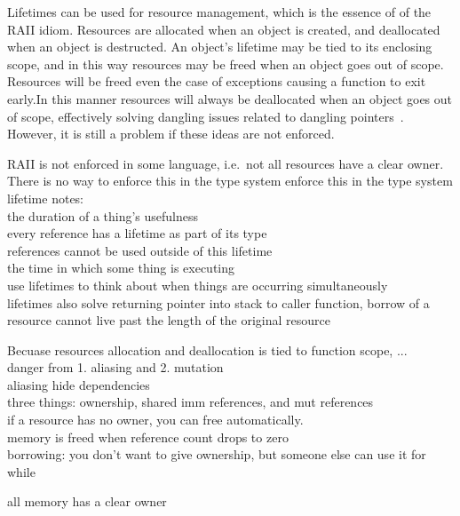 Lifetimes can be used for resource management, which is the essence of of the
RAII idiom. Resources are allocated when an object is created, and deallocated
when an object is destructed. An object's lifetime may be tied to its enclosing
scope, and in this way resources may be freed when an object goes out of scope.
Resources will be freed even the case of exceptions causing a function to exit
early.In this manner resources will always be deallocated when an object goes
out of scope, effectively solving dangling issues related to dangling
pointers~\cite{rust}. However, it is still a problem if these ideas are not
enforced.

RAII is not enforced in some language, i.e.\ not all resources have a clear
owner. There is no way to enforce this in the type system
enforce this in the type system \\

lifetime notes: \\
the duration of a thing's usefulness \\
every reference has a lifetime as part of its type \\
references cannot be used outside of this lifetime \\
the time in which some thing is executing \\
use lifetimes to think about when things are occurring simultaneously \\
lifetimes also solve returning pointer into stack to caller function,
borrow of a resource cannot live past the length of the original resource

Becuase resources allocation and deallocation is tied to function scope, ... \\

danger from 1. aliasing and 2. mutation \\

aliasing hide dependencies \\

three things: ownership, shared imm references, and mut references \\

if a resource has no owner, you can free automatically. \\
memory is freed when reference count drops to zero \\

borrowing: you don't want to give ownership, but someone else can use it for \\
while

all memory has a clear owner \\

